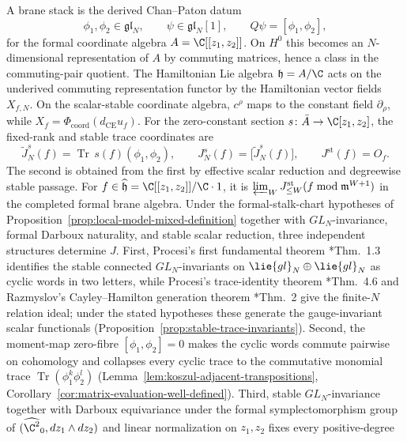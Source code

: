 \documentclass[11pt]{memoir}
\begin{document}
A brane stack is the derived Chan--Paton datum
\[
  \phi_1,\phi_2\in\mathfrak{gl}_N,\qquad
  \psi\in\mathfrak{gl}_N[1],\qquad
  Q\psi=[\phi_1,\phi_2],
\]
for the formal coordinate algebra \(A=\C[[z_1,z_2]]\).  On \(H^0\)
this becomes an \(N\)-dimensional representation of \(A\) by commuting
matrices, hence a class in the commuting-pair quotient.  The Hamiltonian Lie
algebra \(\mathfrak h=A/\C\) acts on the underived commuting
representation functor by the Hamiltonian vector fields \(X_{f,N}\).
On the scalar-stable coordinate algebra, \(c^\rho\) maps to the constant
field \(\partial_\rho\), while
\(X_f=\Phi_{\mathrm{coord}}(d_{\mathrm{CE}}u_f)\).  For the
zero-constant section \(s\colon\bar A\to\C[z_1,z_2]\), the fixed-rank
and stable trace coordinates are
\begin{equation}\label{eq:setup-Jf-flagship}
  \widetilde J_N^s(f)
    =\operatorname{Tr}\,s(f)(\phi_1,\phi_2),
  \qquad
  J_N^s(f)=\bigl[\widetilde J_N^s(f)\bigr],
  \qquad
  J^{\mathrm{st}}(f)=O_f.
\end{equation}
The second is obtained from the first by effective scalar reduction and
degreewise stable passage.  For
\(f\in\widehat{\mathfrak h}=\C[[z_1,z_2]]/\C\cdot1\), it is
\(\varprojlim_WJ^{\mathrm{st}}_{\leq W}
(f\bmod\mathfrak m^{W+1})\) in the completed formal brane algebra.
Under the formal-stalk-chart hypotheses
of Proposition~\ref{prop:local-model-mixed-definition} together with
\(GL_N\)-invariance, formal Darboux naturality, and stable scalar
  reduction, three independent structures determine \(J\). First,
  Procesi's first fundamental theorem \cite{procesi}*{Thm.~1.3}
  identifies the stable connected \(GL_N\)-invariants on
  \(\lie{gl}_N\oplus\lie{gl}_N\) as cyclic words in two letters, while
  Procesi's trace-identity theorem \cite{procesi}*{Thm.~4.6} and
  Razmyslov's Cayley--Hamilton generation theorem
  \cite{razmyslov}*{Thm.~2} give the finite-\(N\) relation ideal; under
  the stated hypotheses these generate the gauge-invariant scalar
  functionals
(Proposition~\ref{prop:stable-trace-invariants}). Second, the
moment-map zero-fibre \([\phi_1,\phi_2]=0\) makes the cyclic words
commute pairwise on cohomology and collapses every cyclic trace to the
commutative monomial trace \(\operatorname{Tr}(\phi_1^k\phi_2^l)\)
(Lemma~\ref{lem:koszul-adjacent-transpositions},
Corollary~\ref{cor:matrix-evaluation-well-defined}). Third, stable
\(GL_N\)-invariance together with Darboux equivariance under the formal
symplectomorphism group of \((\widehat{\C^2}_0,dz_1\wedge dz_2)\) and
linear normalization on \(z_1,z_2\) fixes every positive-degree
\end{document}
